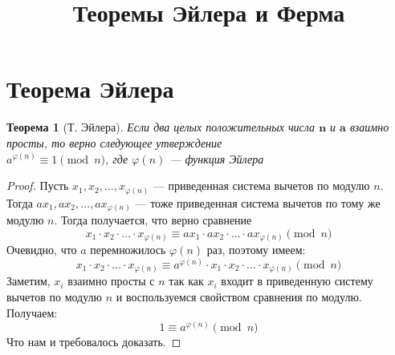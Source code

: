 \documentclass{article}
\title{Теоремы Эйлера и Ферма}
\author{}
\date{}
\newtheorem{theorem}{Теорема}
\begin{document}
\maketitle

\section{Теорема Эйлера}

\begin{theorem}[Т. Эйлера]
Если два целых положительных числа $\textbf{n}$ и $\textbf{a}$ взаимно просты, то верно следующее утверждение\\
\null\qquad\qquad\qquad $a^{\varphi(n)} \equiv 1 \pmod{n}$, \qquad где $\varphi(n)$ — функция Эйлера
\end{theorem}
 
\begin{proof}
Пусть $x_1, x_2, \ldots, x_{\varphi(n)}$ — приведенная система вычетов по модулю $n$. \\
Тогда $ax_1, ax_2, \ldots, ax_{\varphi(n)}$ — тоже приведенная система вычетов по тому же модулю $n$.
Тогда получается, что верно сравнение 
\[ x_1 \cdot x_2 \cdot \ldots \cdot x_{\varphi(n)} \equiv ax_1 \cdot ax_2 \cdot \ldots \cdot ax_{\varphi(n)} \pmod{n} \]
Очевидно, что $a$ перемножилось $\varphi(n)$ раз, поэтому имеем:
\[ x_1 \cdot x_2 \cdot \ldots \cdot x_{\varphi(n)} \equiv a^{\varphi(n)} \cdot  x_1 \cdot x_2 \cdot \ldots \cdot x_{\varphi(n)} \pmod{n} \]
Заметим, $x_i$ взаимно просты с $n$ {так как $x_i$ входит в приведенную систему вычетов по модулю $n$} и воспользуемся свойством сравнения по модулю. Получаем:
\[1  \equiv  a^{\varphi(n)} \pmod{n} \]
Что нам и требовалось доказать.
\end{proof}
\end{document}
